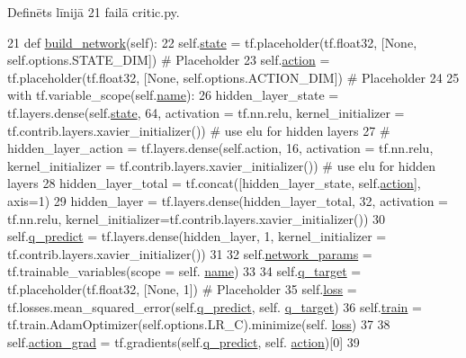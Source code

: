 Definēts līnijā 21 failā critic.\+py.


\begin{DoxyCode}
21     \textcolor{keyword}{def }\hyperlink{classcritic_1_1_critic_network_a6ef997aa35d20b9ff53caa8c87fea17a}{build\_network}(self):
22         self.\hyperlink{classcritic_1_1_critic_network_a21da613cb1688ada3b416e4286649fc2}{state} = tf.placeholder(tf.float32, [\textcolor{keywordtype}{None}, self.options.STATE\_DIM]) \textcolor{comment}{# Placeholder}
23         self.\hyperlink{classcritic_1_1_critic_network_a78b46c2dc517101434ffc7053581f5a6}{action} = tf.placeholder(tf.float32, [\textcolor{keywordtype}{None}, self.options.ACTION\_DIM]) \textcolor{comment}{# Placeholder}
24 
25         with tf.variable\_scope(self.\hyperlink{classcritic_1_1_critic_network_ad7a59dc914d7e6eff3d96c6c819bef38}{name}):
26             hidden\_layer\_state = tf.layers.dense(self.\hyperlink{classcritic_1_1_critic_network_a21da613cb1688ada3b416e4286649fc2}{state}, 64, activation = tf.nn.relu, 
      kernel\_initializer = tf.contrib.layers.xavier\_initializer()) \textcolor{comment}{# use elu for hidden layers}
27             \textcolor{comment}{# hidden\_layer\_action = tf.layers.dense(self.action, 16, activation = tf.nn.relu,
       kernel\_initializer = tf.contrib.layers.xavier\_initializer()) # use elu for hidden layers}
28             hidden\_layer\_total = tf.concat([hidden\_layer\_state, self.\hyperlink{classcritic_1_1_critic_network_a78b46c2dc517101434ffc7053581f5a6}{action}], axis=1)
29             hidden\_layer = tf.layers.dense(hidden\_layer\_total, 32, activation = tf.nn.relu, 
      kernel\_initializer=tf.contrib.layers.xavier\_initializer())
30             self.\hyperlink{classcritic_1_1_critic_network_a5c8a5c7b27312a19cd603216db6e5b52}{q\_predict} = tf.layers.dense(hidden\_layer, 1, kernel\_initializer = 
      tf.contrib.layers.xavier\_initializer())
31 
32         self.\hyperlink{classcritic_1_1_critic_network_a033abaa32fa20baf9d2faaa6a2c6fae3}{network\_params} = tf.trainable\_variables(scope = self.
      \hyperlink{classcritic_1_1_critic_network_ad7a59dc914d7e6eff3d96c6c819bef38}{name})
33 
34         self.\hyperlink{classcritic_1_1_critic_network_acae4004c3e447aaadc7f25ee2a550f60}{q\_target} = tf.placeholder(tf.float32, [\textcolor{keywordtype}{None}, 1]) \textcolor{comment}{# Placeholder}
35         self.\hyperlink{classcritic_1_1_critic_network_a720bbce2d663aea7f91ad957a0d24542}{loss} = tf.losses.mean\_squared\_error(self.\hyperlink{classcritic_1_1_critic_network_a5c8a5c7b27312a19cd603216db6e5b52}{q\_predict}, self.
      \hyperlink{classcritic_1_1_critic_network_acae4004c3e447aaadc7f25ee2a550f60}{q\_target})
36         self.\hyperlink{classcritic_1_1_critic_network_a85b9d34191b5218ce6af960ec3846b4f}{train} = tf.train.AdamOptimizer(self.options.LR\_C).minimize(self.
      \hyperlink{classcritic_1_1_critic_network_a720bbce2d663aea7f91ad957a0d24542}{loss})
37 
38         self.\hyperlink{classcritic_1_1_critic_network_aeec8c7f1d08044b18a6c85868a18174a}{action\_grad} = tf.gradients(self.\hyperlink{classcritic_1_1_critic_network_a5c8a5c7b27312a19cd603216db6e5b52}{q\_predict}, self.
      \hyperlink{classcritic_1_1_critic_network_a78b46c2dc517101434ffc7053581f5a6}{action})[0]
39 
\end{DoxyCode}
